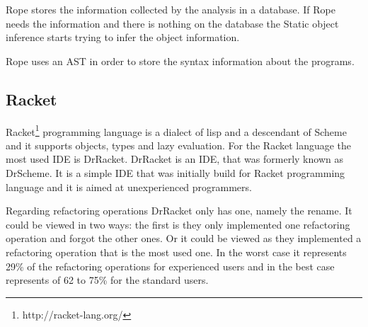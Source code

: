 Rope stores the information collected by the analysis in a database. 
If Rope needs the information and there is nothing on the database the Static object inference starts trying to infer the object information.

Rope uses an AST in order to store the syntax information about the programs.









\subsection{Racket}

Racket\footnote{http://racket-lang.org/} programming language is a dialect of lisp and a descendant of Scheme and it supports objects, types and lazy evaluation.
For the Racket language the most used IDE is DrRacket. 
DrRacket is an IDE, that was formerly known as DrScheme. 
It is a simple IDE that was initially build for Racket programming language and it is aimed at unexperienced programmers.

Regarding refactoring operations DrRacket only has one, namely the rename. 
It could be viewed in two ways: the first is they only implemented one refactoring operation and forgot the other ones.
Or it could be viewed as they implemented a refactoring operation that is the most used one. 
In the worst case it represents 29\% of the refactoring operations for experienced users and in the best case represents of 62 to 75\% for the standard users. 

